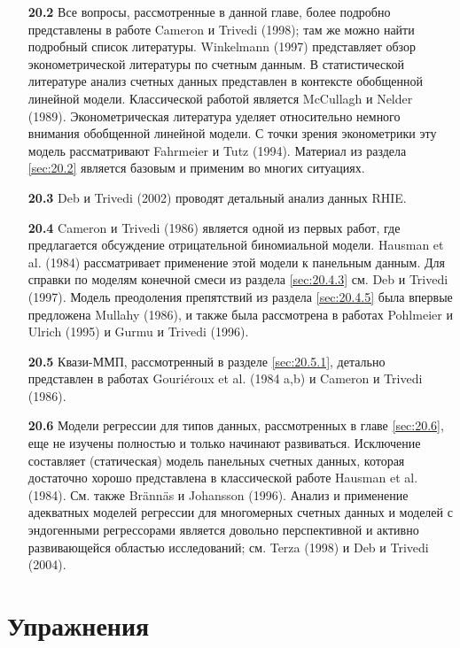 \noindent
\begin{itemize}
    \item[\textbf{20.2}]
Все вопросы, рассмотренные в данной главе, более подробно представлены в работе Cameron и Trivedi (1998); там же можно найти подробный список литературы. Winkelmann (1997) представляет обзор эконометрической литературы по счетным данным. В статистической литературе анализ счетных данных представлен в контексте обобщенной линейной модели. Классической работой является McCullagh и Nelder (1989). Эконометрическая литература уделяет относительно немного внимания обобщенной линейной модели. С точки зрения эконометрики эту модель рассматривают Fahrmeier и Tutz (1994). Материал из раздела \ref{sec:20.2} является базовым и применим во многих ситуациях.

    \item[\textbf{20.3}]
Deb и Trivedi (2002) проводят детальный анализ данных RHIE.

    \item[\textbf{20.4}]
Cameron и Trivedi (1986) является одной из первых работ, где предлагается обсуждение отрицательной биномиальной модели. Hausman et al. (1984) рассматривает применение этой модели к панельным данным. Для справки по моделям конечной смеси из раздела \ref{sec:20.4.3} см. Deb и Trivedi (1997). Модель преодоления препятствий из раздела \ref{sec:20.4.5} была впервые предложена Mullahy (1986), и также была рассмотрена в работах Pohlmeier и Ulrich (1995) и Gurmu и Trivedi (1996).

    \item[\textbf{20.5}]
Квази-ММП, рассмотренный в разделе \ref{sec:20.5.1}, детально представлен в работах Gouri\'eroux et al. (1984 a,b) и Cameron и Trivedi (1986).

    \item[\textbf{20.6}]
Модели регрессии для типов данных, рассмотренных в главе \ref{sec:20.6}, еще не изучены полностью и только начинают развиваться. Исключение составляет (статическая) модель панельных счетных данных, которая достаточно хорошо представлена в классической работе Hausman et al. (1984). См. также Br\"ann\"as и Johansson (1996). Анализ и применение адекватных моделей регрессии для многомерных счетных данных и моделей с эндогенными регрессорами является довольно перспективной и активно развивающейся областью исследований; см. Terza (1998) и Deb и Trivedi (2004).
\end{itemize}




\section{Упражнения}\label{sec:20.ex}

